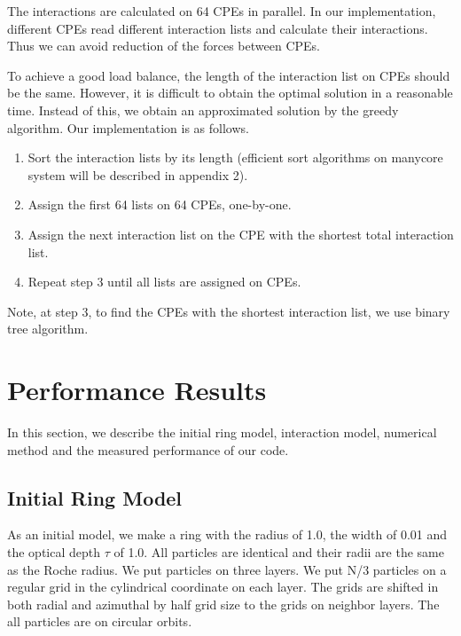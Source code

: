 \documentclass[]{pasj01}
\begin{document}
The interactions are calculated on 64 CPEs in parallel. In our
implementation, different CPEs read different interaction lists and
calculate their interactions. Thus we can avoid reduction of the
forces between CPEs.

To achieve a good load balance, the length of the interaction list on
CPEs should be the same. However, it is difficult to obtain the
optimal solution in a reasonable time. Instead of this, we obtain an
approximated solution by the greedy algorithm. Our implementation is
as follows.

\begin{enumerate}
  
\item Sort the interaction lists by its length (efficient sort
  algorithms on manycore system will be described in appendix 2).

\item Assign the first 64 lists on 64 CPEs, one-by-one.

\item Assign the next interaction list on the CPE with the shortest
  total interaction list.

\item Repeat step 3 until all lists are assigned on CPEs.

\end{enumerate}

Note, at step 3, to find the CPEs with the shortest interaction list,
we use binary tree algorithm.

\section{Performance Results}
\label{sec:result}

In this section, we describe the initial ring model, interaction
model, numerical method and the measured performance of our code.

\subsection{Initial Ring Model}

As an initial model, we make a ring with the radius of 1.0, the width
of 0.01 and the optical depth $\tau$ of 1.0. All particles are
identical and their radii are the same as the Roche radius.  We put
particles on three layers. We put N/3 particles on a regular grid in
the cylindrical coordinate on each layer. The grids are shifted in
both radial and azimuthal by half grid size to the grids on neighbor
layers. The all particles are on circular orbits.
\end{document}
